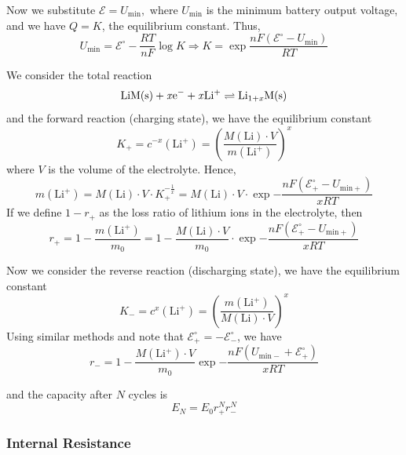 \documentclass[12pt]{article}
\begin{document}
Now we substitute $\mathcal E=U_\mathrm{min},$ where $U_\mathrm{min}$ is the minimum battery output voltage, and we have $Q=K$, the equilibrium constant. Thus,
\begin{equation}
	U_\mathrm{min}=\mathcal E^{\circ}-\frac{RT}{nF}\log K\Rightarrow K=\exp{\frac{nF(\mathcal E^{\circ}-U_\mathrm{min})}{RT}}
\end{equation}

We consider the total reaction
\begin{equation}
	\rm LiM(s)+ \mathit xe^- + \mathit xLi^+ \rightleftharpoons Li_{1+\mathit x}M(s)
\end{equation}
and the forward reaction (charging state), we have the equilibrium constant
\begin{equation}
	K_+=c^{-x}(\mathrm{Li^+})=\left(\frac{M(\mathrm {Li})\cdot V}{m(\mathrm{Li^+})}\right)^x
\end{equation}
where $V$ is the volume of the electrolyte. Hence, 
\begin{equation}
	m(\mathrm{Li^+})=M(\mathrm {Li})\cdot V\cdot K_+^{-\frac{1}{x}}=M(\mathrm {Li})\cdot V\cdot \exp{-\frac{nF(\mathcal E^{\circ}_+-U_\mathrm{min+})}{xRT}}
\end{equation}
If we define $1-r_+$ as the loss ratio of lithium ions in the electrolyte, then
\begin{equation}
	r_+=1-\frac{m(\mathrm{Li^+})}{m_0}=1-\frac{M(\mathrm {Li})\cdot V}{m_0}\cdot \exp{-\frac{nF(\mathcal E^{\circ}_+-U_\mathrm{min+})}{xRT}}
\end{equation}

Now we consider the reverse reaction (discharging state), we have the equilibrium constant
\begin{equation}
	K_-=c^x(\mathrm{Li^+})=\left(\frac{m(\mathrm{Li^+})}{M(\mathrm {Li})\cdot V}\right)^x
\end{equation}
Using similar methods and note that $\mathcal E^{\circ}_+=-\mathcal E^{\circ}_-$, we have
\begin{equation}
	r_-=1-\frac{M\mathrm{(Li^+)}\cdot V}{m_0}\exp {-\frac{nF(U_\mathrm{min-}+\mathcal E^{\circ}_+)}{xRT}}
\end{equation}

and the capacity after $N$ cycles is
\begin{equation}
	E_N=E_0r_+^Nr_-^N
\end{equation}

\subsubsection{Internal Resistance}
\end{document}
